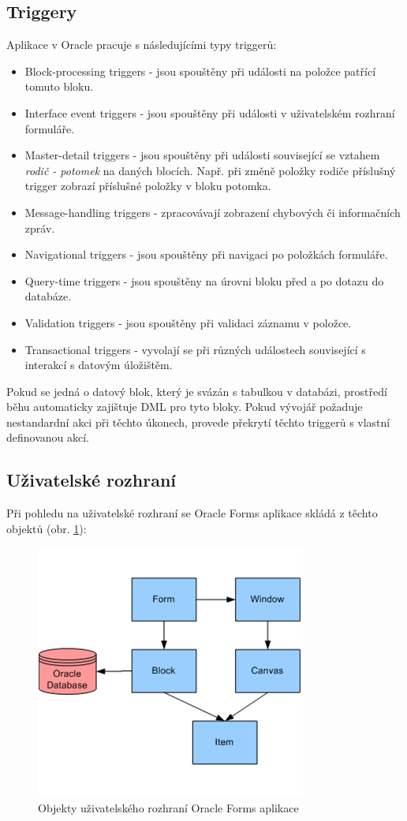 \documentclass{diplomka}
\begin{document}
\subsection*{Triggery}
Aplikace v Oracle pracuje s následujícími typy triggerů:
\begin{itemize}
\item Block-processing triggers - jsou spouštěny při události na položce patřící tomuto bloku.
\item Interface event triggers - jsou spouštěny při události v uživatelském rozhraní formuláře.
\item Master-detail triggers - jsou spouštěny při události související se vztahem \emph{rodič - potomek} na daných blocích. Např. při změně položky rodiče příslušný trigger zobrazí příslušné položky v bloku potomka.
\item Message-handling triggers - zpracovávají zobrazení chybových či informačních zpráv.
\item Navigational triggers - jsou spouštěny při navigaci po položkách formuláře.
\item Query-time triggers - jsou spouštěny na úrovni bloku před a po dotazu do databáze.
\item Validation triggers - jsou spouštěny při validaci záznamu v položce.
\item Transactional triggers - vyvolají se při různých událostech související s interakcí s datovým úložištěm.
\end{itemize}
Pokud se jedná o datový blok, který je svázán s tabulkou v databázi, prostředí běhu automaticky zajištuje DML pro tyto bloky.
Pokud vývojář požaduje nestandardní akci při těchto úkonech, provede překrytí těchto triggerů s vlastní definovanou akcí.
\newpage
\subsection{Uživatelské rozhraní}
Při pohledu na uživatelské rozhraní se Oracle Forms aplikace skládá z těchto objektů (obr. \ref{fig:gui}):
\begin{figure}[H]
  \centering
  \includegraphics[scale=0.8]{obr/window.png}
\caption{Objekty uživatelského rozhraní Oracle Forms aplikace\cite{microsoft}}
\label{fig:gui}
\end{figure}
\end{document}

